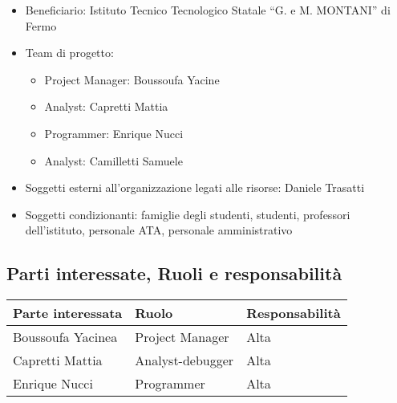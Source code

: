 \documentclass{article}
\begin{document}
\begin{flushleft}
\begin{itemize}
			\item Beneficiario: Istituto Tecnico Tecnologico Statale “G. e M. MONTANI” di Fermo
			
			\item Team di progetto:
			
			\begin{itemize}
				
				\item Project Manager: Boussoufa Yacine
				
				\item Analyst: Capretti Mattia
				
				\item Programmer: Enrique Nucci
				
				\item Analyst: Camilletti Samuele
				
			\end{itemize}
			
			\item Soggetti esterni all'organizzazione legati alle risorse: Daniele Trasatti
			
			\item Soggetti condizionanti: famiglie degli studenti, studenti, professori dell'istituto, personale ATA, personale amministrativo
			
		\end{itemize}
		
		\subsection{Parti interessate, Ruoli e responsabilità}
		
		\begin{tabular}{ |p{4cm}|p{4cm}|p{4cm}|  }
			
			\hline
			
			Parte interessata&Ruolo &Responsabilità\\
			
			\hline
			
			Boussoufa Yacinea&Project Manager&Alta\\
			
			\hline
			
			Capretti Mattia&Analyst-debugger&Alta\\
			
			\hline
			
			Enrique Nucci&Programmer&Alta\\
			
			\hline
			

\end{tabular}
\end{flushleft}
\end{document}
